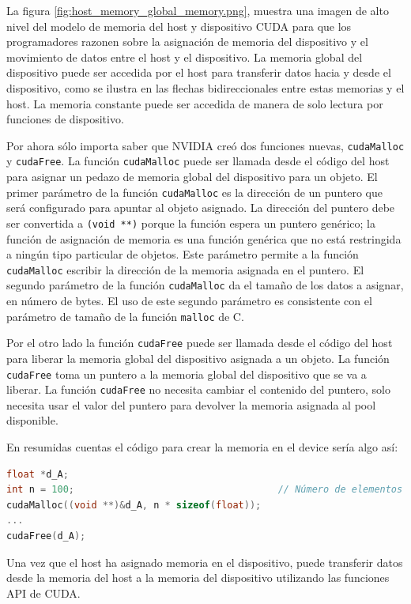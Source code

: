 La figura \ref{fig:host_memory_global_memory.png}, muestra una imagen de alto nivel del modelo de memoria del host y
dispositivo CUDA para que los programadores razonen sobre la asignación de memoria del dispositivo y el movimiento de
datos entre el host y el dispositivo. La memoria global del dispositivo puede ser accedida por el host para transferir
datos hacia y desde el dispositivo, como se ilustra en las flechas bidireccionales entre estas memorias y el host. La
memoria constante puede ser accedida de manera de solo lectura por funciones de dispositivo.

Por ahora sólo importa saber que NVIDIA creó dos funciones nuevas, \texttt{cudaMalloc} y \texttt{cudaFree}. La función
\texttt{cudaMalloc} puede ser llamada desde el código del host para asignar un pedazo de memoria global del dispositivo
para un objeto. El primer parámetro de la función \texttt{cudaMalloc} es la dirección de un puntero que será configurado
para apuntar al objeto asignado. La dirección del puntero debe ser convertida a \texttt{(void **)} porque la función
espera un puntero genérico; la función de asignación de memoria es una función genérica que no está restringida a
ningún tipo particular de objetos. Este parámetro permite a la función \texttt{cudaMalloc} escribir la dirección de la
memoria asignada en el puntero. El segundo parámetro de la función \texttt{cudaMalloc} da el tamaño de los datos a
asignar, en número de bytes. El uso de este segundo parámetro es consistente con el parámetro de tamaño de la función
\texttt{malloc} de C.

Por el otro lado la función \texttt{cudaFree} puede ser llamada desde el código del host para liberar la memoria global
del dispositivo asignada a un objeto. La función \texttt{cudaFree} toma un puntero a la memoria global del dispositivo
que se va a liberar. La función \texttt{cudaFree} no necesita cambiar el contenido del puntero, solo necesita usar el
valor del puntero para devolver la memoria asignada al pool disponible.

En resumidas cuentas el código para crear la memoria en el device sería algo así:

\begin{lstlisting}[language=C]
float *d_A;
int n = 100;                                    // Número de elementos en el vector
cudaMalloc((void **)&d_A, n * sizeof(float));
...
cudaFree(d_A);
\end{lstlisting}

Una vez que el host ha asignado memoria en el dispositivo, puede transferir datos desde la memoria del host a la memoria
del dispositivo utilizando las funciones API de CUDA.

